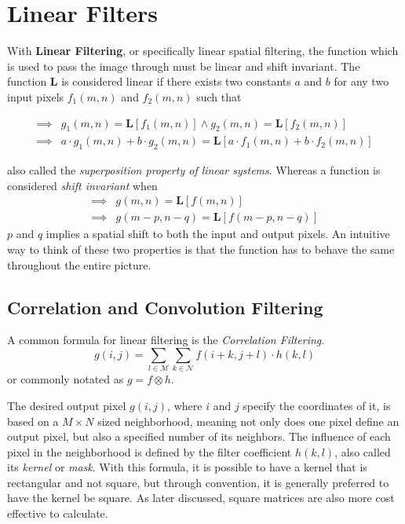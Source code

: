 \documentclass[twoside,a4paper,article]{combine}
\begin{document}
\section{Linear Filters}
With \textbf{Linear Filtering}, or specifically linear spatial filtering, the function which is used to pass the image through
must be linear and shift invariant. The function $\pmb{L}$ is considered linear if there exists two constants $a$ and $b$ for any
two input pixels $f_1(m, n)$ and $f_2(m, n)$ such that

\begin{align*}
    \implies & g_1(m, n) = \boldsymbol{L} [f_1(m, n)] \land g_2(m, n) = \boldsymbol{L} [f_2(m, n)] \\
    \implies & a \cdot g_1(m, n) + b \cdot g_2(m, n) = \boldsymbol{L} [a \cdot f_1(m, n) + b \cdot f_2(m, n)]
\end{align*}

also called the \emph{superposition property of linear systems}\cite{BovikActon09}. Whereas a function is considered \emph{shift invariant} when
\begin{align*}
    \implies & g(m, n) = \boldsymbol{L} [f(m, n)]\\
    \implies & g(m - p, n - q) =  \boldsymbol{L} [f(m - p, n - q)]
\end{align*} $p$ and $q$ implies a spatial shift to both the input and output pixels\cite{BovikActon09}. An intuitive way to think
of these two properties is that the function has to behave the same throughout the entire picture.

\subsection{Correlation and Convolution Filtering}
A common formula for linear filtering is the \emph{Correlation Filtering}\cite{BovikActon09}. 
\[
    g(i,j) = \sum_{l \in \mathscr{M}}\sum_{k \in \mathscr{N}}{f(i+k, j+l) \cdot h(k, l)}
\]
or commonly notated as $g = f \otimes h$.

The desired output pixel $g(i, j)$, where $i$ and $j$ specify the
coordinates of it, is based on a $M \times N$ sized neighborhood, 
meaning not only does one pixel define an output pixel, but also a specified number
of its neighbors. The influence of each pixel in the neighborhood is defined by the filter coefficient $h(k, l)$,
also called its \emph{kernel} or \emph{mask}\cite{Szeliski_2022}. With this formula, it is possible to have a kernel that is rectangular and not square,
but through convention, it is generally preferred to have the kernel be square. As later discussed, square matrices are also more cost effective to calculate.
\end{document}
